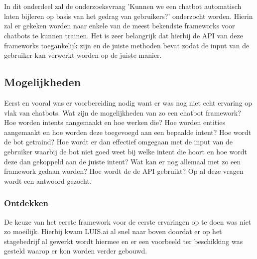 
\chapter{}
\label{ch:methodologie}


In dit onderdeel zal de onderzoeksvraag 'Kunnen we een chatbot automatisch laten bijleren op basis van het gedrag van gebruikers?' onderzocht worden. Hierin zal er gekeken worden naar enkele van de meest bekendste frameworks voor chatbots te kunnen trainen. Het is zeer belangrijk dat hierbij de API van deze frameworks toegankelijk zijn en de juiste methoden bevat zodat de input van de gebruiker kan verwerkt worden op de juiste manier.

\section{Mogelijkheden}
\label{sec:Mogelijkheden}

Eerst en vooral was er voorbereiding nodig want er was nog niet echt ervaring op vlak van chatbots. Wat zijn de mogelijkheden van zo een chatbot framework? Hoe worden intents aangemaakt en hoe werken die? Hoe worden entities aangemaakt en hoe worden deze toegevoegd aan een bepaalde intent? Hoe wordt de bot getraind? Hoe wordt er dan effectief omgegaan met de input van de gebruiker waarbij de bot niet goed weet bij welke intent die hoort en hoe wordt deze dan gekoppeld aan de juiste intent? Wat kan er nog allemaal met zo een framework gedaan worden? Hoe wordt de de API gebruikt? Op al deze vragen wordt een antwoord gezocht.

\subsection{Ontdekken}
\label{Ontdekken}

De keuze van het eerste framework voor de eerste ervaringen op te doen was niet zo moeilijk. Hierbij kwam LUIS.ai al snel naar boven doordat er op het stagebedrijf al gewerkt wordt hiermee en er een voorbeeld ter beschikking was gesteld waarop er kon worden verder gebouwd.

